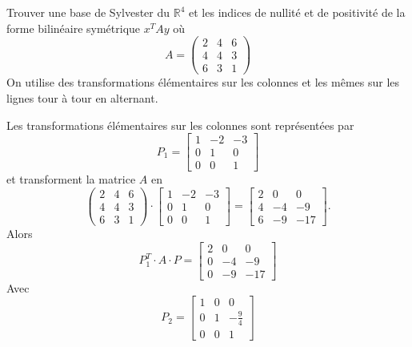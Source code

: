 \begin{example}
  \label{exe:11}
  Trouver une base de Sylvester du $ℝ^4$ et les indices de nullité et de positivité de la forme bilinéaire symétrique $x^TAy$ où  
  \begin{displaymath}
A = 
    \begin{pmatrix}
      2 & 4 & 6 \\
      4 & 4 & 3 \\
      6 & 3 & 1 
    \end{pmatrix}
  \end{displaymath}
On utilise des transformations élémentaires sur les colonnes et les mêmes sur les lignes tour à tour en alternant. 

\noindent Les transformations élémentaires sur les colonnes sont représentées par 
\begin{displaymath}
P_1 = 
  \left[\begin{matrix}1 & -2 & -3\\0 & 1 & 0\\0 & 0 & 1\end{matrix}\right]
\end{displaymath}
et transforment la matrice $A$ en 
\begin{displaymath}
   \begin{pmatrix}
      2 & 4 & 6 \\
      4 & 4 & 3 \\
      6 & 3 & 1 
    \end{pmatrix} \cdot  \left[\begin{matrix}1 & -2 & -3\\0 & 1 & 0\\0 & 0 & 1\end{matrix}\right] = \left[\begin{matrix}2 & 0 & 0\\4 & -4 & -9\\6 & -9 & -17\end{matrix}\right]. 
\end{displaymath}
Alors 
\begin{displaymath}
  P_1^T\cdot A \cdot P = \left[\begin{matrix}2 & 0 & 0\\0 & -4 & -9\\0 & -9 & -17\end{matrix}\right]
\end{displaymath}
Avec 
\begin{displaymath}
  P_2 = \left[\begin{matrix}1 & 0 & 0\\0 & 1 & -\frac{9}{4}\\0 & 0 &1\end{matrix}\right]

\end{displaymath}
\end{example}
